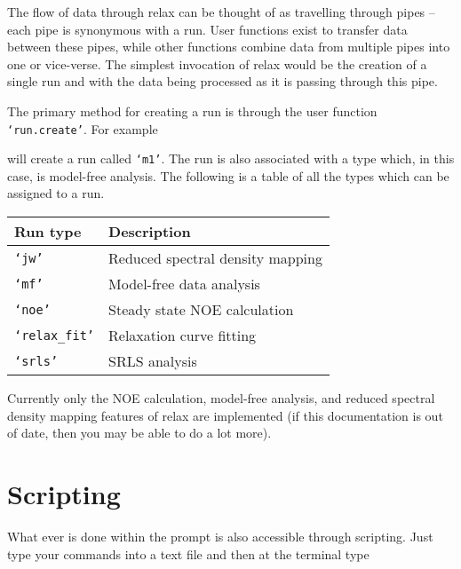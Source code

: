 The flow of data through relax can be thought of as travelling through pipes -- each pipe is synonymous with a run.  User functions  exist to transfer data between these pipes, while other functions combine data from multiple pipes into one or vice-verse.  The simplest invocation of relax would be the creation of a single run and with the data being processed as it is passing through this pipe.

The primary method for creating a run is through the user function  \texttt{`run.create'}.  For example


will create a run called \texttt{`m1'}.  The run is also associated with a type which, in this case, is model-free analysis.  The following is a table of all the types which can be assigned to a run.

\begin{center}
\begin{tabular}{ll}
\toprule

Run type                & Description \\

\midrule

\texttt{`jw'}           & Reduced spectral density mapping \\
\texttt{`mf'}           & Model-free data analysis \\
\texttt{`noe'}          & Steady state NOE calculation \\
\texttt{`relax\_fit'}   & Relaxation curve fitting \\
\texttt{`srls'}         & SRLS analysis \\

\bottomrule
\end{tabular}
\end{center}

Currently only the NOE calculation, model-free analysis, and reduced spectral density mapping features of relax are implemented (if this documentation is out of date, then you may be able to do a lot more).




\section{Scripting}

What ever is done within the prompt is also accessible through scripting.  Just type your commands into a text file and then at the terminal type

